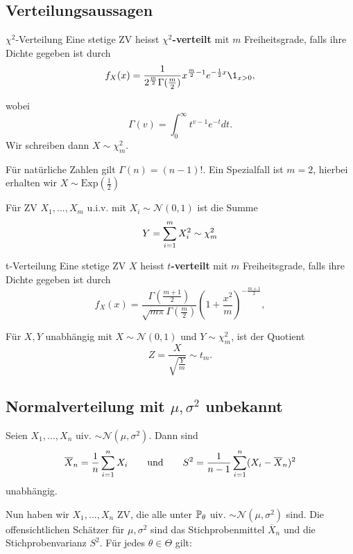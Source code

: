 \subsection{Verteilungsaussagen}

\begin{mainbox}{{$\chi^2$-Verteilung}}
Eine stetige ZV heisst \textbf{$\chi^2$-verteilt} mit $m$ Freiheitsgrade, falls ihre Dichte gegeben ist durch
$$f_X(x) = \frac{1}{2^{\frac{m}{2}} \Gamma (\frac{m}{2})} x^{\frac{m}{2}-1} e^{-\frac{1}{2}x} \1_{x > 0},$$
\end{mainbox}
wobei 
$$\Gamma(v) = \int_0^\infty t^{v-1} e^{-t} dt.$$
Wir schreiben dann $X \sim \chi^2_m$.

Für natürliche Zahlen gilt $\Gamma(n) = (n-1)!$. Ein Spezialfall ist $m = 2$, hierbei erhalten wir $X \sim \text{Exp}(\frac{1}{2})$ \medskip

\begin{subbox}{} Für ZV $X_1, ..., X_m$ u.i.v. mit $X_i \sim \mathcal{N}(0,1)$ ist die Summe 
$$Y = \sum\limits_{i=1}^m X_i^2 \sim \chi_m^2$$
\end{subbox}
\begin{mainbox}{t-Verteilung}
Eine stetige ZV $X$ heisst \textbf{$t$-verteilt} mit $m$ Freiheitsgrade, falls ihre Dichte gegeben ist durch 
$$f_X(x) = \frac{\Gamma (\frac{m+1}{2})}{\sqrt{m \pi} \Gamma (\frac{m}{2})} \left( 1 + \frac{x^2}{m} \right)^{-\frac{m+1}{2}},$$
\end{mainbox}
\begin{subbox}{} Für $X, Y$ unabhängig mit $X \sim \mathcal{N}(0,1)$ und $Y \sim \chi^2_m$, ist der Quotient
$$Z = \frac{X}{\sqrt{\frac{Y}{m}}} \sim t_m.$$\end{subbox}


\subsection{Normalverteilung mit $\mu, \sigma^2$ unbekannt }

\begin{subbox}{} Seien $X_1,...,X_n$ uiv. $\sim \mathcal{N}(\mu, \sigma^2)$. Dann sind
$$\overline{X}_n = \frac{1}{n} \sum\limits_{i=1}^n X_i \qquad \text{und} \qquad S^2 = \frac{1}{n-1} \sum\limits_{i = 1}^n (X_i - \overline{X}_n)^2$$
unabhängig. \end{subbox}

Nun haben wir $X_1,...,X_n$ ZV, die alle unter $\mathbb{P}_\theta$ uiv. $\sim \mathcal{N}(\mu, \sigma^2)$ sind. Die offensichtlichen Schätzer für $\mu, \sigma^2$ sind das Stichprobenmittel $\overline{X}_n$ und die Stichprobenvarianz $S^2$. Für jedes $\theta \in \Theta$ gilt:

